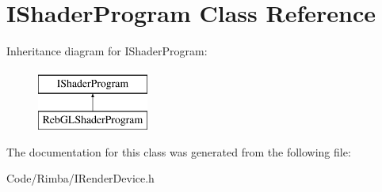 \hypertarget{class_i_shader_program}{}\section{I\+Shader\+Program Class Reference}
\label{class_i_shader_program}
Inheritance diagram for I\+Shader\+Program\+:\begin{figure}[H]
\begin{center}
\leavevmode
\includegraphics[height=2.000000cm]{class_i_shader_program}
\end{center}
\end{figure}


The documentation for this class was generated from the following file\+:\begin{DoxyCompactItemize}
\item 
Code/\+Rimba/I\+Render\+Device.\+h\end{DoxyCompactItemize}
